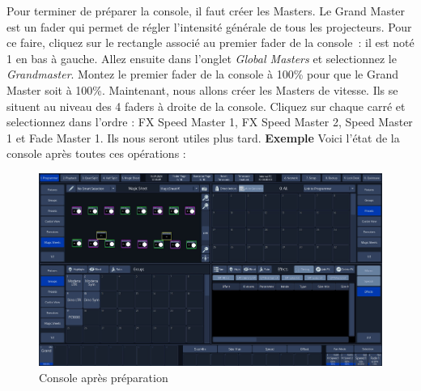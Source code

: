 Pour terminer de préparer la console, il faut créer les Masters.
Le Grand Master est un fader qui permet de régler l'intensité générale de tous les projecteurs.
\newline
Pour ce faire, cliquez sur le rectangle associé au premier fader de la console~: il est noté 1 en bas à gauche.
\newline
Allez ensuite dans l'onglet \textit{Global Masters} et selectionnez le \textit{Grandmaster}.
\newline
\newline
Montez le premier fader de la console à 100\% pour que le Grand Master soit à 100\%.
\newline
\newline
Maintenant, nous allons créer les Masters de vitesse. Ils se situent au niveau des 4 faders à droite de la console.
Cliquez sur chaque carré et selectionnez dans l'ordre : FX Speed Master 1, FX Speed Master 2, Speed Master 1 et Fade Master 1.
\newline
Ils nous seront utiles plus tard.
\newline
\newline
\textbf{Exemple}
\newline
\newline
Voici l'état de la console après toutes ces opérations :
\begin{figure}[H]
    \centering
    \includegraphics[width=\textwidth]{3 - Encoder la Chimp/Images/prep_final.jpg}
    \caption{Console après préparation}
    \label{fig:prep_finale}
\end{figure}
